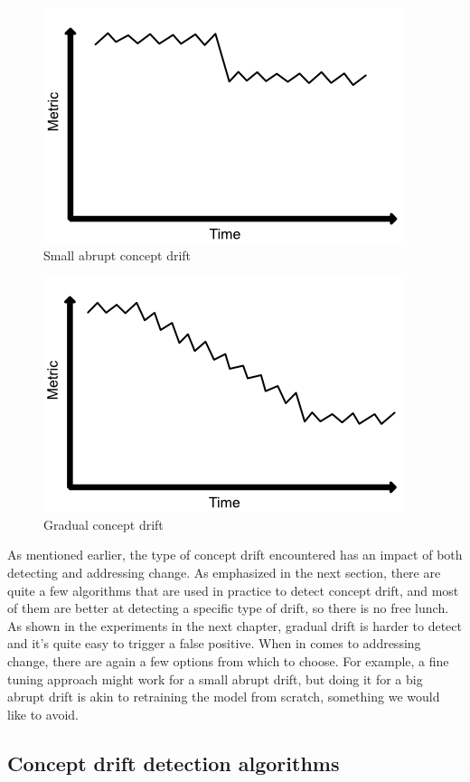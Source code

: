 \documentclass[12pt]{extreport}
\begin{document}
\begin{figure}[ht!]
\centering
\includegraphics[width=0.6\linewidth]{assets/preliminaries/small-abrupt-drift.png}
\caption{Small abrupt concept drift}
\label{fig:small-abrupt-drift}
\end{figure}

\begin{figure}[ht!]
\centering
\includegraphics[width=0.6\linewidth]{assets/preliminaries/gradual-drift.png}
\caption{Gradual concept drift}
\label{fig:gradual-drift}
\end{figure}

As mentioned earlier, the type of concept drift encountered has an impact of both detecting and addressing change. As emphasized in the next section, there are quite a few algorithms that are used in practice to detect concept drift, and most of them are better at detecting a specific type of drift, so there is no free lunch. As shown in the experiments in the next chapter, gradual drift is harder to detect and it's quite easy to trigger a false positive. When in comes to addressing change, there are again a few options from which to choose. For example, a fine tuning approach might work for a small abrupt drift, but doing it for a big abrupt drift is akin to retraining the model from scratch, something we would like to avoid.

\subsection{Concept drift detection algorithms} \label{sec:cda}
\end{document}
